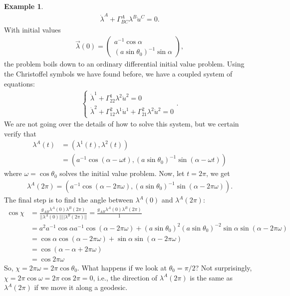 \documentclass{book}
\theoremstyle{definition}
\newtheorem{exmp}{Example}[section]
\begin{document}
\begin{exmp}
	\begin{align*}
	\dot{\lambda}^A + \Gamma^A_{BC}\lambda^B\dot{u}^C = 0.
	\end{align*}
	With initial values
	\begin{align*}
	\vec{\lambda}(0) = 
	\begin{pmatrix}
	a^{-1}\cos\alpha\\
	\left(a\sin\theta_0 \right)^{-1}\sin\alpha 
	\end{pmatrix},
	\end{align*}
	the problem boils down to an ordinary differential initial value problem. Using the Christoffel symbols we have found before, we have a coupled system of equations:
	\begin{align*}
	\begin{cases*}
	\dot{\lambda}^1 + \Gamma^1_{22}\lambda^2 \dot{u}^2 = 0\\
	\dot{\lambda}^2 + \Gamma^2_{12}\lambda^1\dot{u}^1 + \Gamma^2_{21}\lambda^2\dot{u}^2= 0
	\end{cases*}.
	\end{align*}
	We are not going over the details of how to solve this system, but we certain verify that 
	\begin{align*}
	\lambda^A(t) &= \left( \lambda^1(t),\lambda^2(t)\right)\\
	&= \left(a^{-1}\cos(\alpha-\omega t), \left( a\sin\theta_0\right)^{-1}\sin(\alpha-\omega t)  \right)  
	\end{align*}
	where $\omega = \cos\theta_0$ solves the initial value problem. Now, let $t = 2\pi$, we get
	\begin{align*}
	\lambda^A(2\pi) = \left(a^{-1}\cos(\alpha - 2\pi\omega) , \left(a\sin\theta_0 \right)^{-1}\sin(\alpha-2\pi\omega)  \right). 
	\end{align*}
	The final step is to find the angle between $\lambda^A(0)$ and $\lambda^A(2\pi)$:
	\begin{align*}
	\cos\chi &= \frac{g_{AB}\lambda^A(0)\lambda^B(2\pi)}{\vert\vert \lambda^A(0)\vert\vert\vert\vert \lambda^B(2\pi)\vert\vert} = \frac{g_{AB}\lambda^A(0)\lambda^B(2\pi)}{1}\\
	&= a^2a^{-1}\cos\alpha a^{-1}\cos(\alpha-2\pi\omega) + (a\sin\theta_0)^2(a\sin\theta_0)^{-2}\sin\alpha\sin(\alpha-2\pi\omega)\\
	&= \cos\alpha\cos(\alpha-2\pi\omega) + \sin\alpha \sin(\alpha-2\pi\omega)\\
	&= \cos(\alpha-\alpha + 2\pi\omega)\\
	&= \cos 2\pi\omega
	\end{align*}
	So, ${\chi = 2\pi\omega = 2\pi\cos\theta_0}$. What happens if we look at $\theta_0 = \pi/2$? Not surprisingly, $\chi = 2\pi\cos\omega = 2\pi\cos 2\pi = 0$, i.e., the direction of $\lambda^A(2\pi)$ is the same as $\lambda^{A}(2\pi)$ if we move it along a geodesic. 
\end{exmp}
\end{document}

